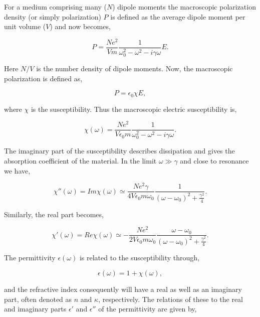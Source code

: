 \documentclass[12pt]{iopart}
\begin{document}
For a medium comprising many ($N$) dipole moments the macroscopic polarization density (or simply polarization) $P$ is defined as the average dipole moment per unit volume ($V$) and now
becomes,

\begin{equation}
P = \frac{N e^2}{Vm} \frac{1}{ \omega_0^2 - \omega^2 - i\gamma \omega} E.
\label{Pwlb}
\end{equation} 

\noindent Here $N/V$ is the number density of dipole moments. Now, the macroscopic polarization is defined as,
 
\begin{equation}
P = \epsilon_0 \chi E,
\end{equation}

\noindent where $\chi$ is the susceptibility. Thus the macroscopic electric susceptibility is,

\begin{equation}
\chi (\omega) = \frac{N e^2}{V\epsilon_0 m} \frac{1}{ \omega_0^2 - \omega^2 - i\gamma \omega} .  \label{chiPT}
\end{equation}

The imaginary part of the susceptibility describes dissipation and gives the absorption coefficient of the material. In the limit $\omega \gg \gamma$ 
and close to resonance we have,

\begin{equation}
\chi'' (\omega) = Im \chi (\omega) \simeq \frac{N e^2 \gamma}{4 V \epsilon_0 m\omega_0} \frac{1}{ (\omega - \omega_0)^2 + \frac{\gamma^2}{4}}.
\end{equation}

\noindent Similarly, the real part becomes,
 
\begin{equation}
\chi' (\omega) = Re \chi (\omega) \simeq -\frac{N e^2 }{2 V \epsilon_0 m\omega_0} \frac{\omega-\omega_0}{ (\omega - \omega_0)^2 + \frac{\gamma^2}{4}}.
\end{equation}

\noindent The permittivity $\epsilon(\omega)$ is related to the susceptibility through,

\begin{equation}
\epsilon(\omega) = 1 + \chi (\omega) ,  \label{epsilon_PT}
\end{equation}

\noindent and the refractive index consequently will have a real as well as an imaginary part, often denoted as $n$ and $\kappa$, respectively. The relations of these to the real and imaginary parts $\epsilon'$ and $\epsilon''$ of the permittivity are given by,
\end{document}
